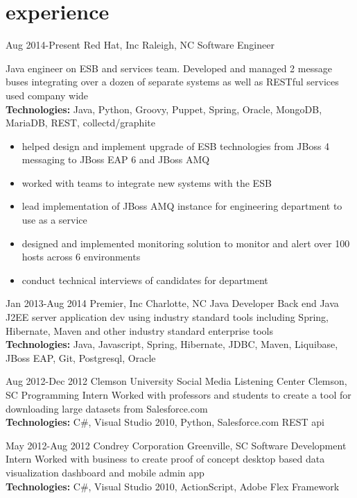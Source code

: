 
\section{experience}

\begin{entrylist}


\workentry
{Aug 2014-Present}
{Red Hat, Inc}
{Raleigh, NC}
{Software Engineer}
{Java engineer on ESB and services team. Developed and managed 2 message buses integrating over a dozen of separate systems as well as RESTful services used company wide \\
\textbf{Technologies:} Java, Python, Groovy, Puppet, Spring, Oracle, MongoDB, MariaDB, REST, collectd/graphite
\begin{itemize}
\item helped design and implement upgrade of ESB technologies from JBoss 4 messaging to JBoss EAP 6 and JBoss AMQ
\item worked with teams to integrate new systems with the ESB
\item lead implementation of JBoss AMQ instance for engineering department to use as a service
\item designed and implemented monitoring solution to monitor and alert over 100 hosts across 6 environments
\item conduct technical interviews of candidates for department
\end{itemize}}

\workentry
{Jan 2013-Aug 2014}
{Premier, Inc}
{Charlotte, NC}
{Java Developer}
{Back end Java J2EE server application dev using industry standard tools including Spring, Hibernate, Maven and other industry standard enterprise tools \\
\textbf{Technologies:} Java, Javascript, Spring, Hibernate, JDBC, Maven, Liquibase, JBoss EAP, Git, Postgresql, Oracle}

\workentry
{Aug 2012-Dec 2012}
{Clemson University Social Media Listening Center}
{Clemson, SC}
{Programming Intern}
{Worked with professors and students to create a tool for downloading large datasets from Salesforce.com \\
\textbf{Technologies:} C\#, Visual Studio 2010, Python, Salesforce.com REST api}

\workentry
{May 2012-Aug 2012}
{Condrey Corporation}
{Greenville, SC}
{Software Development Intern}
{Worked with business to create proof of concept desktop based data visualization dashboard and mobile admin app \\
\textbf{Technologies:} C\#, Visual Studio 2010, ActionScript, Adobe Flex Framework}


\end{entrylist}

